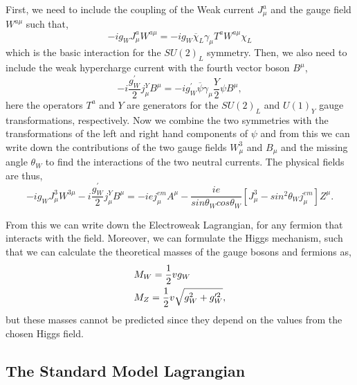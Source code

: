 First, we need to include the coupling of the Weak current $J^a_\mu$ and the gauge field $W^{a\mu}$ such that,
\begin{equation}
-ig_WJ^a_\mu W^{a\mu}=-ig_W\overline{\chi}_L\gamma_\mu T^aW^{a\mu}\chi_L
\end{equation}
which is the basic interaction for the $SU(2)_L$ symmetry. Then, we also need to include the weak hypercharge current with the fourth vector boson $B^\mu$,
\begin{equation}
-i\frac{g_W^{\prime}}{2}j_\mu^YB^\mu=-ig_W^{\prime}\overline{\psi}\gamma_\mu\frac{Y}{2}\psi B^\mu, 
\end{equation}
here the operators $T^a$ and $Y$ are generators for the $SU(2)_L$ and $U(1)_Y$ gauge transformations, respectively. Now we combine the two symmetries with the transformations of the left and right hand components of $\psi$ and from this we can write down the contributions of the two gauge fields $W_\mu^3$ and $B_\mu$ and the missing angle $\theta_W$ to find the interactions of the two neutral currents. The physical fields are thus,
\begin{equation}
-ig_WJ_\mu^3W^{3\mu}-i\frac{g_W^{\prime}}{2}j_\mu^YB^\mu=-iej_\mu^{em}A^\mu-\frac{ie}{sin\theta_Wcos\theta_W}[J_\mu^3-sin^2\theta_Wj_\mu^{em}]Z^\mu.
\end{equation}

From this we can write down the Electroweak Lagrangian, for any fermion that interacts with the field. Moreover, we can formulate the Higgs mechanism, such that we can calculate the theoretical masses of the gauge bosons and fermions as, 
\begin{equation}
\begin{split}
& M_{W}=\frac{1}{2}vg_W \\
& M_{Z}=\frac{1}{2}v\sqrt{g_W^2+g_W^{\prime 2}},
\end{split}
\end{equation}
but these masses cannot be predicted since they depend on the values from the chosen Higgs field. 

\subsection{The Standard Model Lagrangian}

